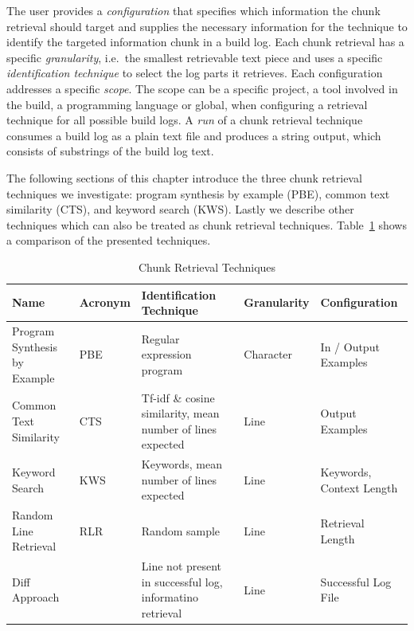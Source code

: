 \documentclass[\myrootdir/main.tex]{subfiles}
\begin{document}
The user provides a \textit{configuration} that specifies which information the chunk retrieval should target and supplies the necessary information for the technique to identify the targeted information chunk in a build log.
Each chunk retrieval has a specific \textit{granularity}, i.e.\ the smallest retrievable text piece and uses a specific \textit{identification technique} to select the log parts it retrieves.
Each configuration addresses a specific \textit{scope}.
The scope can be a specific project, a tool involved in the build, a programming language or global, when configuring a retrieval technique for all possible build logs.
A \emph{run} of a chunk retrieval technique consumes a build log as a plain text file and produces a string output, which consists of substrings of the build log text.

The following sections of this chapter introduce the three chunk retrieval techniques we investigate: program synthesis by example (PBE), common text similarity (CTS), and keyword search (KWS).
Lastly we describe other techniques which can also be treated as chunk retrieval techniques.
Table~\ref{tab:ctr} shows a comparison of the presented techniques.

\begin{table}[htbp]
\centering
\caption{Chunk Retrieval Techniques}
\begin{tabularx}{\textwidth}{@{}XlXlX@{}} 
\toprule
Name                         & Acronym & Identification Technique                                   & Granularity & Configuration             \\ 
\midrule
Program Synthesis by Example & PBE     & Regular expression program                                 & Character   & In / Output Examples      \\
Common Text Similarity       & CTS     & Tf-idf \& cosine similarity, mean number of lines expected & Line        & Output Examples           \\
Keyword Search               & KWS     & Keywords, mean number of lines expected                    & Line        & Keywords, Context Length  \\
Random Line Retrieval        & RLR     & Random sample                                              & Line        & Retrieval Length          \\
Diff Approach                &         & Line not present in successful log, informatino retrieval  & Line        & Successful Log File       \\
\bottomrule
\end{tabularx}
\label{tab:ctr}
\end{table}
\end{document}
